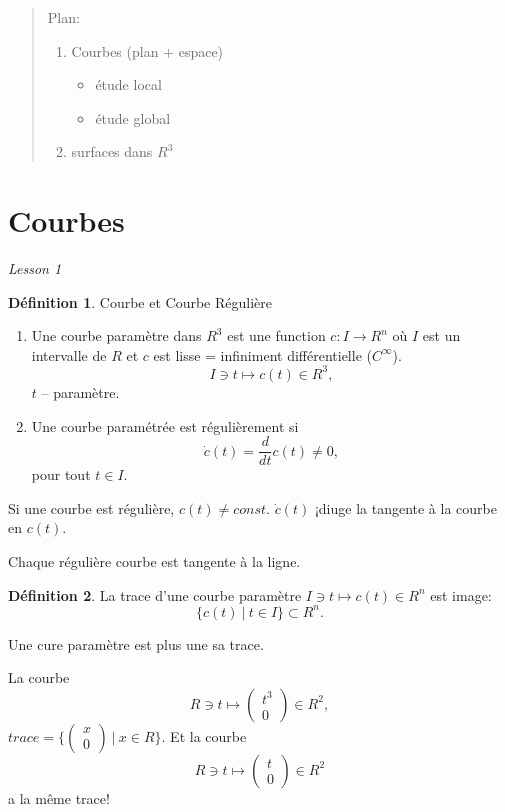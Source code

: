 \documentclass[french]{article}
\theoremstyle{definition}
\newtheorem{definition}{Définition}[section]
\theoremstyle{theorem}
\theoremstyle{proposition}
\theoremstyle{lemme}
\begin{document}
 
\tableofcontents
 
 
\begin{abstract}
Plan:
\begin{enumerate}
\item Courbes (plan + espace)
\begin{itemize}
\item étude local
\item étude global
\end{itemize}
\item surfaces dans $R^3$
\end{enumerate}\end{abstract}
 
\section{Courbes}

\emph{Lesson 1}

\theoremstyle{definition}
\begin{definition}{Courbe et Courbe Régulière}
\begin{enumerate}
\item Une courbe paramètre dans $R^3$ est une function $c:I\rightarrow R^n$ où $I$ est un intervalle de $R$ et $c$ est lisse = infiniment différentielle ($C^\infty$).
$$I\ni t\mapsto c(t)\in R^3,$$
$t$ -- paramètre.
\item Une courbe paramétrée est régulièrement si
$$\dot{c}(t) = \frac{d}{dt}c(t)\neq 0,$$
pour tout $t\in I$.
\end{enumerate}
\end{definition}

Si une courbe est régulière, $c(t)\neq const$. $\dot{c}(t)$ ¡diuge la tangente à la courbe en $c(t)$.

Chaque régulière courbe est tangente à la ligne.

\begin{definition} La trace d'une courbe paramètre $I\ni t \mapsto c(t)\in R^n$ est image:
$$\{c(t)\ |\ t\in I\} \subset R^n.$$
\end{definition}

Une cure paramètre est plus une sa trace.

La courbe $$R\ni t \mapsto \left( \begin{array}{c} t^3 \\ 0 \end{array} \right) \in R^2,$$ 
$trace = \{ \left( \begin{array}{c} x \\ 0 \end{array} \right)\ |\ x\in R \}$. Et la courbe $$R\ni t \mapsto \left( \begin{array}{c} t \\ 0 \end{array} \right) \in R^2$$ a la même trace!
\end{document}
